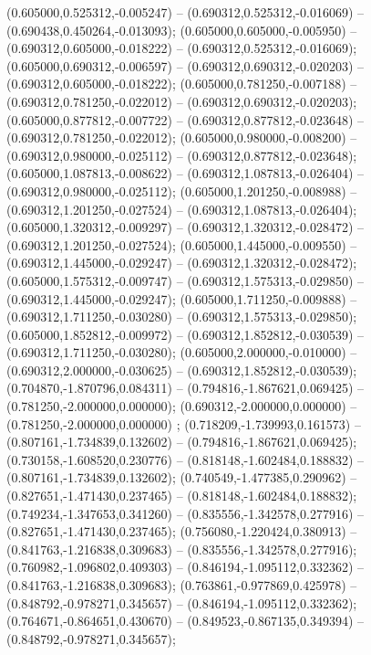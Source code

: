  (0.605000,0.525312,-0.005247) -- (0.690312,0.525312,-0.016069) -- (0.690438,0.450264,-0.013093);
 (0.605000,0.605000,-0.005950) -- (0.690312,0.605000,-0.018222) -- (0.690312,0.525312,-0.016069);
 (0.605000,0.690312,-0.006597) -- (0.690312,0.690312,-0.020203) -- (0.690312,0.605000,-0.018222);
 (0.605000,0.781250,-0.007188) -- (0.690312,0.781250,-0.022012) -- (0.690312,0.690312,-0.020203);
 (0.605000,0.877812,-0.007722) -- (0.690312,0.877812,-0.023648) -- (0.690312,0.781250,-0.022012);
 (0.605000,0.980000,-0.008200) -- (0.690312,0.980000,-0.025112) -- (0.690312,0.877812,-0.023648);
 (0.605000,1.087813,-0.008622) -- (0.690312,1.087813,-0.026404) -- (0.690312,0.980000,-0.025112);
 (0.605000,1.201250,-0.008988) -- (0.690312,1.201250,-0.027524) -- (0.690312,1.087813,-0.026404);
 (0.605000,1.320312,-0.009297) -- (0.690312,1.320312,-0.028472) -- (0.690312,1.201250,-0.027524);
 (0.605000,1.445000,-0.009550) -- (0.690312,1.445000,-0.029247) -- (0.690312,1.320312,-0.028472);
 (0.605000,1.575312,-0.009747) -- (0.690312,1.575313,-0.029850) -- (0.690312,1.445000,-0.029247);
 (0.605000,1.711250,-0.009888) -- (0.690312,1.711250,-0.030280) -- (0.690312,1.575313,-0.029850);
 (0.605000,1.852812,-0.009972) -- (0.690312,1.852812,-0.030539) -- (0.690312,1.711250,-0.030280);
 (0.605000,2.000000,-0.010000) -- (0.690312,2.000000,-0.030625) -- (0.690312,1.852812,-0.030539);
 (0.704870,-1.870796,0.084311) -- (0.794816,-1.867621,0.069425) -- (0.781250,-2.000000,0.000000);
 (0.690312,-2.000000,0.000000) -- (0.781250,-2.000000,0.000000) ;
 (0.718209,-1.739993,0.161573) -- (0.807161,-1.734839,0.132602) -- (0.794816,-1.867621,0.069425);
 (0.730158,-1.608520,0.230776) -- (0.818148,-1.602484,0.188832) -- (0.807161,-1.734839,0.132602);
 (0.740549,-1.477385,0.290962) -- (0.827651,-1.471430,0.237465) -- (0.818148,-1.602484,0.188832);
 (0.749234,-1.347653,0.341260) -- (0.835556,-1.342578,0.277916) -- (0.827651,-1.471430,0.237465);
 (0.756080,-1.220424,0.380913) -- (0.841763,-1.216838,0.309683) -- (0.835556,-1.342578,0.277916);
 (0.760982,-1.096802,0.409303) -- (0.846194,-1.095112,0.332362) -- (0.841763,-1.216838,0.309683);
 (0.763861,-0.977869,0.425978) -- (0.848792,-0.978271,0.345657) -- (0.846194,-1.095112,0.332362);
 (0.764671,-0.864651,0.430670) -- (0.849523,-0.867135,0.349394) -- (0.848792,-0.978271,0.345657);

